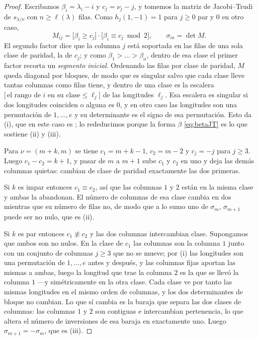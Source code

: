 \documentclass[11pt,reqno]{amsart}
\theoremstyle{plain}
\theoremstyle{definition}
\begin{document}
\begin{proof}
Escribamos $\beta_i=\lambda_i-i$ y $c_j=\nu_j-j$, y tomemos la matriz de Jacobi--Trudi de
$s_{\lambda/\nu}$ con $n\ge\ell(\lambda)$ filas. Como $h_j(1,-1)=1$ para $j\ge0$ par y $0$ en otro
caso,
\begin{equation}\label{eq:betaJT}
M_{ij}=\bigl[\beta_i\ge c_j\bigr]\cdot\bigl[\beta_i\equiv c_j \bmod 2\bigr],\qquad
\sigma_m=\det M .
\end{equation}
El segundo factor dice que la columna $j$ está soportada en las filas de una sola clase de paridad,
la de $c_j$; y como $\beta_1>\dots>\beta_n$, dentro de esa clase el primer factor recorta un
\emph{segmento inicial}. Ordenando las filas por clase de paridad, $M$ queda diagonal por bloques,
de modo que es singular salvo que cada clase lleve tantas columnas como filas tiene, y dentro de una
clase es la escalera $\bigl[\,\text{el rango de }i\text{ en su clase}\le\ell_j\bigr]$ de las
longitudes $\ell_j$. Esa escalera es singular si dos longitudes coinciden o alguna es $0$, y en otro
caso las longitudes son una permutación de $1,\dots,e$ y su determinante es el signo de esa
permutación. Esto da (i), que en este caso es \cite[p.~91]{Mac95}; lo rededucimos porque la forma
$\beta$ \eqref{eq:betaJT} es lo que sostiene (ii) y (iii).

Para $\nu=(m+k,m)$ se tiene $c_1=m+k-1$, $c_2=m-2$ y $c_j=-j$ para $j\ge3$. Luego $c_1-c_2=k+1$, y
pasar de $m$ a $m+1$ sube $c_1$ y $c_2$ en uno y deja las demás columnas quietas: cambian de clase
de paridad exactamente las dos primeras.

Si $k$ es impar entonces $c_1\equiv c_2$, así que las columnas $1$ y $2$ están en la misma clase y
ambas la abandonan. El número de columnas de esa clase cambia en dos mientras que su número de filas
no, de modo que a lo sumo uno de $\sigma_m$, $\sigma_{m+1}$ puede ser no nulo, que es (ii).

Si $k$ es par entonces $c_1\not\equiv c_2$ y las dos columnas intercambian clase. Supongamos que
ambos son no nulos. En la clase de $c_1$ las columnas son la columna $1$ junto con un conjunto de
columnas $j\ge3$ que no se mueve; por (i) las longitudes son una permutación de $1,\dots,e$ antes y
después, y las columnas fijas aportan las mismas a ambas, luego la longitud que trae la columna $2$
es la que se llevó la columna $1$ ---y simétricamente en la otra clase. Cada clase ve por tanto las
mismas longitudes en el mismo orden de columnas, y los dos determinantes de bloque no cambian. Lo
que sí cambia es la baraja que separa las dos clases de columnas: las columnas $1$ y $2$ son
contiguas e intercambian pertenencia, lo que altera el número de inversiones de esa baraja en
exactamente uno. Luego $\sigma_{m+1}=-\sigma_m$, que es (iii).
\end{proof}
\end{document}
